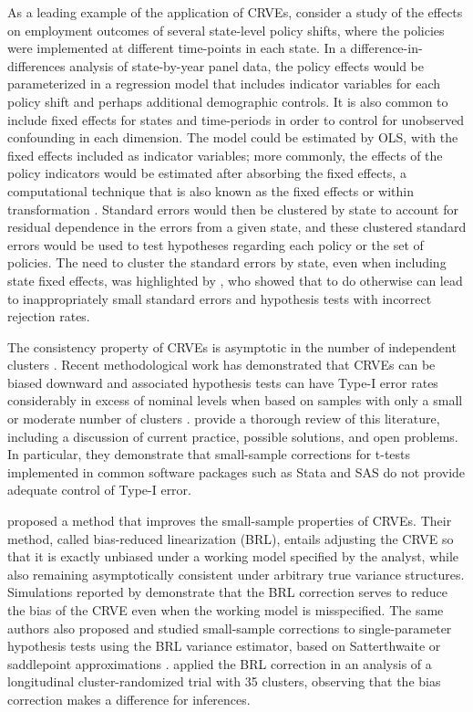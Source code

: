 \documentclass[12pt]{article}\usepackage[]{graphicx}\usepackage[]{color}
\begin{document}
As a leading example of the application of CRVEs, consider a study of the effects on employment outcomes of several state-level policy shifts, where the policies were implemented at different time-points in each state. 
In a difference-in-differences analysis of state-by-year panel data, the policy effects would be parameterized in a regression model that includes indicator variables for each policy shift and perhaps additional demographic controls. It is also common to include fixed effects for states and time-periods in order to control for unobserved confounding in each dimension. 
The model could be estimated by OLS, with the fixed effects included as indicator variables; more commonly, the effects of the policy indicators would be estimated after absorbing the fixed effects, a computational technique that is also known as the fixed effects or within transformation \citep{Wooldridge2010econometric}. 
Standard errors would then be clustered by state to account for residual dependence in the errors from a given state, and these clustered standard errors would be used to test hypotheses regarding each policy or the set of policies.
The need to cluster the standard errors by state, even when including state fixed effects, was highlighted by \citet{Bertrand2004how}, who showed that to do otherwise can lead to inappropriately small standard errors and hypothesis tests with incorrect rejection rates. 

The consistency property of CRVEs is asymptotic in the number of independent clusters \citep{Wooldridge2003cluster}.
Recent methodological work has demonstrated that CRVEs can be biased downward and associated hypothesis tests can have Type-I error rates considerably in excess of nominal levels when based on samples with only a small or moderate number of clusters \citep[e.g.,][]{Webb2013wild}.
\citet{Cameron2015practitioners} provide a thorough review of this literature, including a discussion of current practice, possible solutions, and open problems. 
In particular, they demonstrate that small-sample corrections for t-tests implemented in common software packages such as Stata and SAS do not provide adequate control of Type-I error. 

\citet[see also \citealt{McCaffrey2001generalizations}]{Bell2002bias} proposed a method that improves the small-sample properties of CRVEs. 
Their method, called bias-reduced linearization (BRL), entails adjusting the CRVE so that it is exactly unbiased under a working model specified by the analyst, while also remaining asymptotically consistent under arbitrary true variance structures. 
Simulations reported by \citet{Bell2002bias} demonstrate that the BRL correction serves to reduce the bias of the CRVE even when the working model is misspecified. 
The same authors also proposed and studied small-sample corrections to single-parameter hypothesis tests using the BRL variance estimator, based on Satterthwaite \citep{Bell2002bias} or saddlepoint approximations \citep{McCaffrey2006improved}. 
\citet{Angrist2009effects} applied the BRL correction in an analysis of a longitudinal cluster-randomized trial with 35 clusters, observing that the bias correction makes a difference for inferences. 
\end{document}
